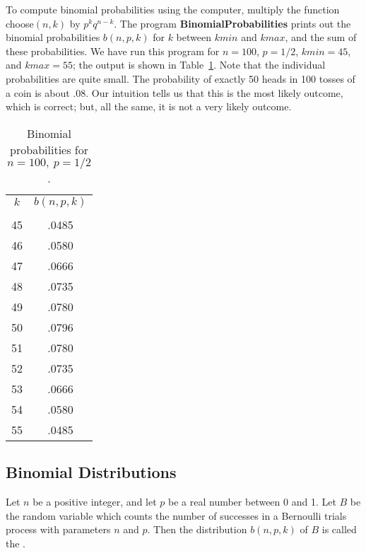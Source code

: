 To compute binomial probabilities using the computer, multiply the function
choose$(n,k)$ by $p^kq^{n - k}$.  The program {\bf
BinomialProbabilities} prints out the binomial probabilities
$b(n, p, k)$ for $k$ between $kmin$ and $kmax$, and the sum of these probabilities.  We have run this
program for $n = 100$, $p = 1/2$, $kmin = 45$, and $kmax = 55$; the output is shown in
Table~\ref{table 3.27}.  Note that the individual probabilities are quite small.  The probability of
exactly 50 heads in 100 tosses of a coin is about .08.  Our intuition tells us that this is the most
likely outcome, which is correct; but, all the same, it is not a very likely outcome.

\begin{table}
\centering
\begin{tabular}{cc} $k$     & $b(n,p,k)$ \\
\\ 
45 & .0485 \\
46 & .0580 \\
47 & .0666 \\
48 & .0735 \\
49 & .0780 \\
50 & .0796 \\
51 & .0780 \\
52 & .0735 \\
53 & .0666 \\
54 & .0580 \\
55 & .0485 \\

\end{tabular}
\caption{Binomial probabilities for $n = 100,\ p = 1/2$.}
\label{table 3.27}
\end{table}




\subsection*{Binomial Distributions}

\begin{definition}\label{def 3.5} Let $n$ be a positive integer, and let $p$ be a real
number between 0 and 1.  Let $B$ be the random variable which counts the number of
successes in a Bernoulli trials process with parameters $n$ and $p$.  Then the
distribution $b(n, p, k)$ of $B$ is called the .
\end{definition}

